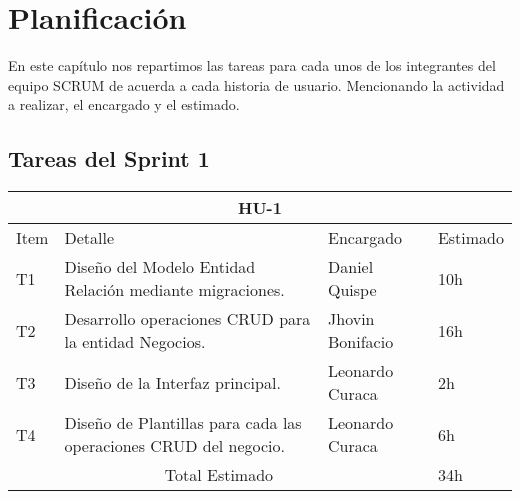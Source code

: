 \chapter{Planificación}
En este capítulo nos repartimos las tareas para cada unos de los integrantes del equipo SCRUM de acuerda a cada historia de usuario. Mencionando la actividad a realizar, el encargado y el estimado.

\section{Tareas del Sprint 1}
\begin{table}[htbp]
	\begin{center}
		\begin{tabular}{| p{0.7cm} | p{10cm} | p{3.2cm} | p{1.8cm}|}
			\hline
			\multicolumn{4}{|c|}{HU-1}\\
			\hline
			Item & Detalle & Encargado & Estimado \\
			\hline
			T1 & Diseño del Modelo Entidad Relación mediante migraciones. & Daniel Quispe & 10h \\
			\hline
			T2 & Desarrollo operaciones CRUD para la entidad Negocios. & Jhovin Bonifacio & 16h \\
			\hline
			T3 & Diseño de la Interfaz principal. & Leonardo Curaca & 2h \\
			\hline
			T4 & Diseño de Plantillas para cada las operaciones CRUD del negocio. & Leonardo Curaca & 6h \\
			\hline
			\multicolumn{3}{|c|}{Total Estimado} & 34h\\
			\hline
		\end{tabular}
	\end{center}
\end{table}


